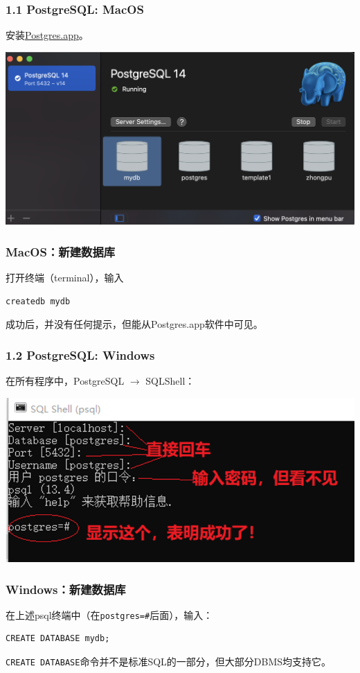 \documentclass[aspectratio=169, 14pt]{beamer}
\begin{document}
\begin{frame}
	\frametitle{1.1 PostgreSQL: MacOS}
	安装\href{https://postgresapp.com/}{Postgres.app}。

	\includegraphics[width=.8\textwidth]{week4/pg-mac}

\end{frame}

\begin{frame}[fragile]
	\frametitle{MacOS：新建数据库}

	打开终端（terminal），输入

	\begin{verbatim}
createdb mydb
    \end{verbatim}

	成功后，并没有任何提示，但能从Postgres.app软件中可见。
\end{frame}

\begin{frame}
	\frametitle{1.2 PostgreSQL: Windows}
	在所有程序中，PostgreSQL $\rightarrow$ SQLShell：

	\includegraphics[width=.8\textwidth]{week4/pg-windows}
\end{frame}

\begin{frame}[fragile]
	\frametitle{Windows：新建数据库}
	在上述psql终端中（在\texttt{postgres=\#}后面），输入：

	\begin{verbatim}
CREATE DATABASE mydb; 
\end{verbatim}


	\texttt{CREATE DATABASE}命令并不是标准SQL的一部分，但大部分DBMS均支持它。
\end{frame}
\end{document}
